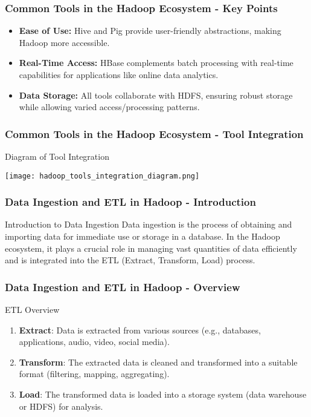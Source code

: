 \documentclass[aspectratio=169]{beamer}
\begin{document}
\begin{frame}[fragile]
    \frametitle{Common Tools in the Hadoop Ecosystem - Key Points}
    \begin{itemize}
        \item \textbf{Ease of Use:} Hive and Pig provide user-friendly abstractions, making Hadoop more accessible.
        \item \textbf{Real-Time Access:} HBase complements batch processing with real-time capabilities for applications like online data analytics.
        \item \textbf{Data Storage:} All tools collaborate with HDFS, ensuring robust storage while allowing varied access/processing patterns.
    \end{itemize}
\end{frame}

\begin{frame}[fragile]
    \frametitle{Common Tools in the Hadoop Ecosystem - Tool Integration}
    \begin{block}{Diagram of Tool Integration}
        \begin{center}
            \texttt{[image: hadoop\_tools\_integration\_diagram.png]}
        \end{center}
    \end{block}
\end{frame}

\begin{frame}[fragile]
    \frametitle{Data Ingestion and ETL in Hadoop - Introduction}
    \begin{block}{Introduction to Data Ingestion}
        Data ingestion is the process of obtaining and importing data for immediate use or storage in a database. 
        In the Hadoop ecosystem, it plays a crucial role in managing vast quantities of data efficiently and is integrated into the ETL (Extract, Transform, Load) process.
    \end{block}
\end{frame}

\begin{frame}[fragile]
    \frametitle{Data Ingestion and ETL in Hadoop - Overview}
    \begin{block}{ETL Overview}
        \begin{enumerate}
            \item \textbf{Extract}: Data is extracted from various sources (e.g., databases, applications, audio, video, social media).
            \item \textbf{Transform}: The extracted data is cleaned and transformed into a suitable format (filtering, mapping, aggregating).
            \item \textbf{Load}: The transformed data is loaded into a storage system (data warehouse or HDFS) for analysis.
        \end{enumerate}
    \end{block}
\end{frame}
\end{document}
